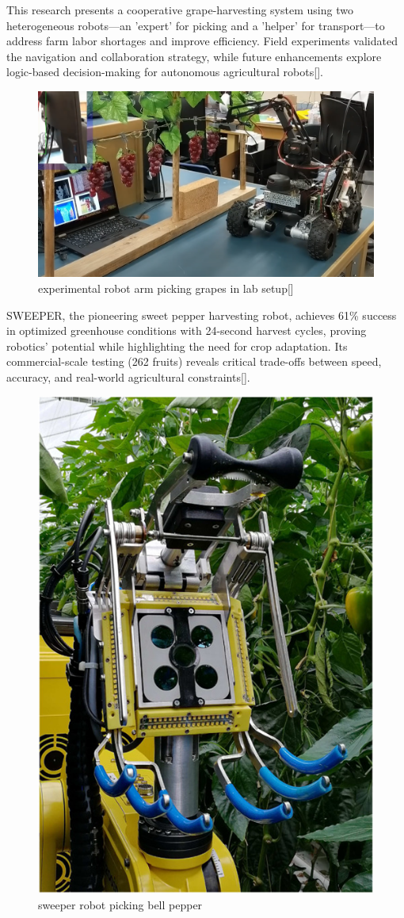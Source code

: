 This research presents a cooperative grape-harvesting system using two heterogeneous robots—an 'expert' for picking and a 'helper' for transport—to address farm labor shortages and improve efficiency. Field experiments validated the navigation and collaboration strategy, while future enhancements explore logic-based decision-making for autonomous agricultural robots[\cite{robot_grape}].
\begin{figure}
    \centering
    \includegraphics[width=0.75\linewidth]{pictures/grape_robot.png}
    \caption{experimental robot arm picking grapes in lab setup[\cite{robot_grape}]}
    \label{fig:enter-label}
\end{figure}


SWEEPER, the pioneering sweet pepper harvesting robot, achieves 61\% success in optimized greenhouse conditions with 24-second harvest cycles, proving robotics' potential while highlighting the need for crop adaptation. Its commercial-scale testing (262 fruits) reveals critical trade-offs between speed, accuracy, and real-world agricultural constraints[\cite{SweeperProject}].

\begin{figure}
    \centering
    \includegraphics[width=0.5\linewidth]{pictures/bell_pepper.jpg}
    \caption{sweeper robot picking bell pepper}
    \label{fig:enter-label}
\end{figure}

